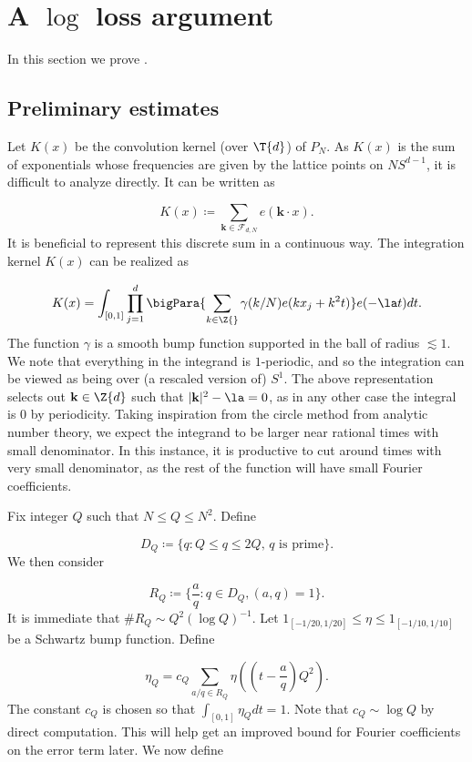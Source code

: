 \documentclass[11pt]{amsart}
\begin{document}
\section{A $\log$ loss argument}\label{Section2}
\noindent
In this section we prove .


\subsection{Preliminary estimates}
Let $K(x)$ be the convolution kernel (over $\T{d}$) of $P_N$. As $K(x)$ is the sum of exponentials whose frequencies are given by the lattice points on $NS^{d-1}$, it is difficult to analyze directly. It can be written as

\begin{equation}\label{2: kernel1stDefEqn}
    K(x) \coloneq \sum_{\mathbf{k}\in\mathcal{F}_{d,N}}e(\mathbf{k}\cdot x).
\end{equation}
It is beneficial to represent this discrete sum in a continuous way. The integration kernel $K(x)$ can be realized as

\begin{equation}\label{2: intKernelEquation}
    K(x) = \int_{[0,1]}\prod_{j=1}^d \bigPara{\sum_{k\in\Z{}}\gamma(k/N)e(kx_j+k^2t)} e(-\la t)dt.
\end{equation}
The function $\gamma$ is a smooth bump function supported in the ball of radius $\lesssim 1$. We note that everything in the integrand is $1$-periodic, and so the integration can be viewed as being over (a rescaled version of) $S^1$. The above representation selects out $\mathbf{k}\in\Z{d}$ such that $|\mathbf{k}|^2-\la = 0$, as in any other case the integral is $0$ by periodicity. Taking inspiration from the circle method from analytic number theory, we expect the integrand to be larger near rational times with small denominator. In this instance, it is productive to cut around times with very small denominator, as the rest of the function will have small Fourier coefficients.

Fix integer $Q$ such that $N\leq Q\leq N^2$. Define

$$D_{Q}\coloneq \{q: Q\leq q \leq 2Q,\, q\text{ is prime} \}.$$
We then consider 

$$R_{Q} \coloneq \{\frac{a}{q}: q\in D_Q, (a,q)=1\}.$$
It is immediate that $\#R_{Q}\sim Q^2(\log Q)^{-1}$. Let $1_{[-1/20,1/20]}\leq \eta \leq 1_{[-1/10,1/10]}$ be a Schwartz bump function. Define

\begin{equation}\label{2: etaQDef}
    \eta_Q = c_Q \sum_{a/q\in R_{Q}}\eta((t-\frac{a}{q})Q^2).
\end{equation}
The constant $c_Q$ is chosen so that $\int_{[0,1]} \eta_Q dt = 1$. Note that $c_Q \sim \log Q$ by direct computation. This will help get an improved bound for Fourier coefficients on the error term later. We now define
\end{document}
